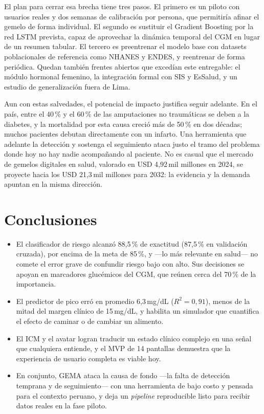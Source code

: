 \documentclass[9pt,letterpaper,twocolumn]{extarticle}
\begin{document}
El plan para cerrar esa brecha tiene tres pasos. El primero es un piloto con
usuarios reales y dos semanas de calibración por persona, que permitiría afinar
el gemelo de forma individual. El segundo es sustituir el Gradient Boosting por
la red LSTM prevista, capaz de aprovechar la dinámica temporal del CGM en lugar
de un resumen tabular. El tercero es preentrenar el modelo base con datasets
poblacionales de referencia como NHANES y ENDES, y reentrenar de forma periódica.
Quedan también frentes abiertos que excedían este entregable: el módulo hormonal
femenino, la integración formal con SIS y EsSalud, y un estudio de generalización
fuera de Lima.

Aun con estas salvedades, el potencial de impacto justifica seguir adelante. En
el país, entre el 40\,\% y el 60\,\% de las amputaciones no traumáticas se deben
a la diabetes, y la mortalidad por esta causa creció más de 50\,\% en dos
décadas; muchos pacientes debutan directamente con un infarto. Una herramienta
que adelante la detección y sostenga el seguimiento ataca justo el tramo del
problema donde hoy no hay nadie acompañando al paciente. No es casual que el
mercado de gemelos digitales en salud, valorado en USD 4,92\,mil millones en
2024, se proyecte hacia los USD 21,3\,mil millones para 2032: la evidencia y la
demanda apuntan en la misma dirección.

\section{Conclusiones}
\begin{itemize}[leftmargin=1.1em,itemsep=2pt,topsep=2pt]
\item El clasificador de riesgo alcanzó 88,5\,\% de exactitud (87,5\,\% en
validación cruzada), por encima de la meta de 85\,\%, y ---lo más relevante en
salud--- no comete el error grave de confundir riesgo bajo con alto. Sus
decisiones se apoyan en marcadores glucémicos del CGM, que reúnen cerca del
70\,\% de la importancia.
\item El predictor de pico erró en promedio 6,3\,mg/dL ($R^2=0{,}91$), menos de
la mitad del margen clínico de 15\,mg/dL, y habilita un simulador que cuantifica
el efecto de caminar o de cambiar un alimento.
\item El ICM y el avatar logran traducir un estado clínico complejo en una señal
que cualquiera entiende, y el MVP de 14 pantallas demuestra que la experiencia
de usuario completa es viable hoy.
\item En conjunto, GEMA ataca la causa de fondo ---la falta de detección
temprana y de seguimiento--- con una herramienta de bajo costo y pensada para el
contexto peruano, y deja un \emph{pipeline} reproducible listo para recibir datos
reales en la fase piloto.
\end{itemize}
\end{document}
